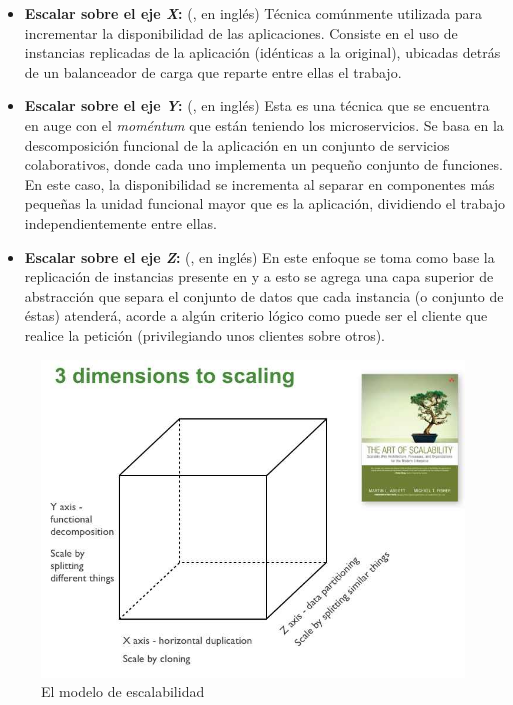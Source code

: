 \begin{itemize}
  \item \textbf{Escalar sobre el eje \textit{X}:} (, en inglés) Técnica comúnmente utilizada para incrementar la disponibilidad de las aplicaciones. Consiste en el uso de instancias replicadas de la aplicación (idénticas a la original), ubicadas detrás de un balanceador de carga que reparte entre ellas el trabajo.
  \item \textbf{Escalar sobre el eje \textit{Y}:} (, en inglés) Esta es una técnica que se encuentra en auge con el \textit{moméntum} que están teniendo los microservicios. Se basa en la descomposición funcional de la aplicación en un conjunto de servicios colaborativos, donde cada uno implementa un pequeño conjunto de funciones. En este caso, la disponibilidad se incrementa al separar en componentes más pequeñas la unidad funcional mayor que es la aplicación, dividiendo el trabajo independientemente entre ellas.
  \item \textbf{Escalar sobre el eje \textit{Z}:} (, en inglés) En este enfoque se toma como base la replicación de instancias presente en  y a esto se agrega una capa superior de abstracción que separa el conjunto de datos que cada instancia (o conjunto de éstas) atenderá, acorde a algún criterio lógico como puede ser el cliente que realice la petición (privilegiando unos clientes sobre otros).
\end{itemize}

\begin{figure}[H]
  \includegraphics[width=\linewidth]{src/images/04-capitulo-4/scale_cube.jpg}
  \caption{El modelo de escalabilidad }
  \label{fig:scale-cube}
\end{figure}

